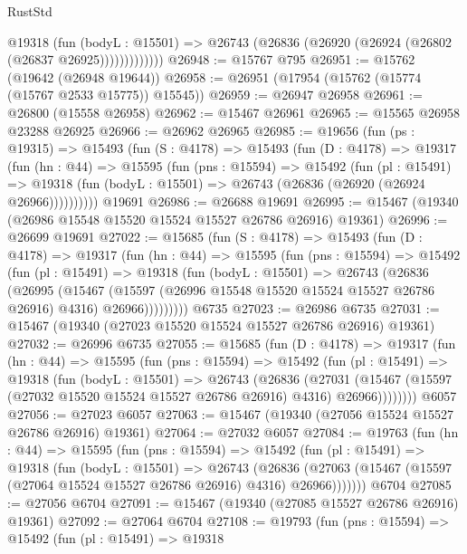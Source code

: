 \begin{lexlean}{RustStd}
\begin{coremodule}
                @19318
                  (fun (bodyL : @15501) =>
                  @26743 (@26836 (@26920 (@26924 (@26802 (@26837 @26925)))))))))))))
@26948 := @15767 @795
@26951 := @15762 (@19642 (@26948 @19644))
@26958 := @26951 (@17954 (@15762 (@15774 (@15767 @2533 @15775)) @15545))
@26959 := @26947 @26958
@26961 := @26800 (@15558 @26958)
@26962 := @15467 @26961
@26965 := @15565 @26958 @23288 @26925
@26966 := @26962 @26965
@26985 := @19656
    (fun (ps : @19315) =>
    @15493
      (fun (S : @4178) =>
      @15493
        (fun (D : @4178) =>
        @19317
          (fun (hn : @44) =>
          @15595
            (fun (pns : @15594) =>
            @15492
              (fun (pl : @15491) =>
              @19318 (fun (bodyL : @15501) => @26743 (@26836 (@26920 (@26924 @26966))))))))))
    @19691
@26986 := @26688 @19691
@26995 := @15467 (@19340 (@26986 @15548 @15520 @15524 @15527 @26786 @26916) @19361)
@26996 := @26699 @19691
@27022 := @15685
    (fun (S : @4178) =>
    @15493
      (fun (D : @4178) =>
      @19317
        (fun (hn : @44) =>
        @15595
          (fun (pns : @15594) =>
          @15492
            (fun (pl : @15491) =>
            @19318
              (fun (bodyL : @15501) =>
              @26743
                (@26836
                  (@26995
                    (@15467
                      (@15597 (@26996 @15548 @15520 @15524 @15527 @26786 @26916) @4316)
                      @26966)))))))))
    @6735
@27023 := @26986 @6735
@27031 := @15467 (@19340 (@27023 @15520 @15524 @15527 @26786 @26916) @19361)
@27032 := @26996 @6735
@27055 := @15685
    (fun (D : @4178) =>
    @19317
      (fun (hn : @44) =>
      @15595
        (fun (pns : @15594) =>
        @15492
          (fun (pl : @15491) =>
          @19318
            (fun (bodyL : @15501) =>
            @26743
              (@26836
                (@27031
                  (@15467 (@15597 (@27032 @15520 @15524 @15527 @26786 @26916) @4316) @26966))))))))
    @6057
@27056 := @27023 @6057
@27063 := @15467 (@19340 (@27056 @15524 @15527 @26786 @26916) @19361)
@27064 := @27032 @6057
@27084 := @19763
    (fun (hn : @44) =>
    @15595
      (fun (pns : @15594) =>
      @15492
        (fun (pl : @15491) =>
        @19318
          (fun (bodyL : @15501) =>
          @26743
            (@26836
              (@27063 (@15467 (@15597 (@27064 @15524 @15527 @26786 @26916) @4316) @26966)))))))
    @6704
@27085 := @27056 @6704
@27091 := @15467 (@19340 (@27085 @15527 @26786 @26916) @19361)
@27092 := @27064 @6704
@27108 := @19793
    (fun (pns : @15594) =>
    @15492
      (fun (pl : @15491) =>
      @19318

\end{coremodule}
\end{lexlean}
